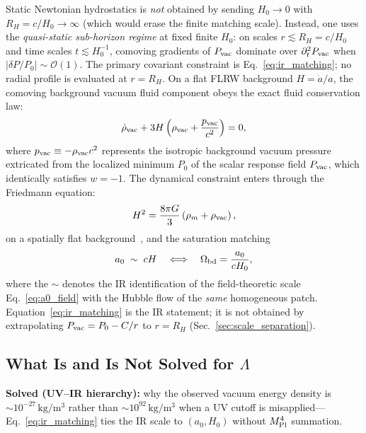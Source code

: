 \documentclass[prd,
               reprint,
               aps,
               preprintnumbers,
               nofootinbib,
               longbibliography,
               floatfix]{revtex4-2}
\begin{document}
Static Newtonian hydrostatics is \emph{not} obtained by
sending $H_0\to 0$ with $R_H=c/H_0\to\infty$ (which
would erase the finite matching scale).
Instead, one uses the \emph{quasi-static sub-horizon
regime} at fixed finite $H_0$: on scales
$r\lesssim R_H=c/H_0$ and time scales $t\lesssim H_0^{-1}$,
comoving gradients of $P_{\rm vac}$ dominate over
$\partial_t^2 P_{\rm vac}$ when
$|  \delta P/P_0|\sim\mathcal{O}(1)$.
The primary covariant constraint is
Eq.~\eqref{eq:ir_matching}; no radial profile is
evaluated at $r=R_H$.
On a flat FLRW background $H=\dot a/a$, the comoving
background vacuum fluid component obeys the exact fluid
conservation law:
\begin{equation}
\label{eq:flrw_conservation}
\dot\rho_{\rm vac}+3H\left(\rho_{\rm vac}+
\frac{p_{\rm vac}}{c^2}\right)=0,
\end{equation}
where $p_{\rm vac} \equiv -\rho_{\rm vac} c^2$ represents
the isotropic background vacuum pressure extricated from
the localized minimum $P_0$ of the scalar response field
$P_{\rm vac}$, which identically satisfies $w=-1$.
The dynamical constraint enters through the Friedmann
equation:
\begin{equation}
\label{eq:friedmann}
H^2=\frac{8\pi G}{3}\left(\rho_m+\rho_{\rm vac}\right),
\end{equation}
on a spatially flat
background~\cite{Peebles1993,Planck2020},
and the saturation matching
\begin{equation}
\label{eq:ir_matching}
a_0 \;\sim\; cH
\quad\Longleftrightarrow\quad
\Omega_{\rm bd}=\frac{a_0}{cH_0},
\end{equation}
where the $\sim$ denotes the IR identification of the
field-theoretic scale Eq.~\eqref{eq:a0_field} with the
Hubble flow of the \emph{same} homogeneous patch.
Equation~\eqref{eq:ir_matching} is the IR statement; it
is not obtained by extrapolating $P_{\rm vac}=P_0-C/r$
to $r=R_H$ (Sec.~\ref{sec:scale_separation}).

\subsection{What Is and Is Not Solved for
\texorpdfstring{$\Lambda$}{Lambda}}
\label{sec:scope_lambda}

\textbf{Solved (UV--IR hierarchy):} why the observed
vacuum energy density is $\sim10^{-27}\,\mathrm{kg/m^3}$
rather than $\sim10^{92}\,\mathrm{kg/m^3}$ when a UV
cutoff is misapplied---Eq.~\eqref{eq:ir_matching}
ties the IR scale to $(a_0,H_0)$ without
$M_{\rm Pl}^4$ summation.
\end{document}
